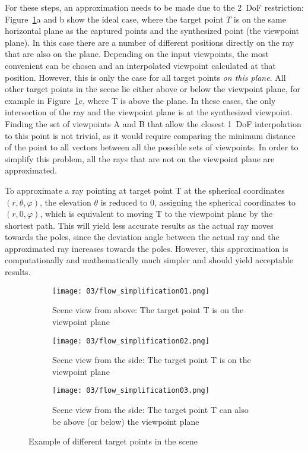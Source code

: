 For these steps, an approximation needs to be made due to the 2~DoF restriction: Figure~\ref{fig:flow_simplification-mot}a and b show the ideal case, where the target point $T$ is on the same horizontal plane as the captured points and the synthesized point (the viewpoint plane). In this case there are a number of different positions directly on the ray that are also on the plane. Depending on the input viewpoints, the most convenient can be chosen and an interpolated viewpoint calculated at that position. However, this is only the case for all target points \emph{on this plane}. All other target points in the scene lie either above or below the viewpoint plane, for example in Figure~\ref{fig:flow_simplification-mot}c, where T is above the plane. In these cases, the only intersection of the ray and the viewpoint plane is at the synthesized viewpoint. Finding the set of viewpoints A and B that allow the closest 1~DoF interpolation to this point is not trivial, as it would require comparing the minimum distance of the point to all vectors between all the possible sets of viewpoints. In order to simplify this problem, all the rays that are not on the viewpoint plane are approximated.

To approximate a ray pointing at target point T at the spherical coordinates $(r, \theta, \varphi)$, the elevation $\theta$ is reduced to 0, assigning the spherical coordinates to $(r, 0, \varphi)$, which is equivalent to moving T to the viewpoint plane by the shortest path. This will yield less accurate results as the actual ray moves towards the poles, since the deviation angle between the actual ray and the approximated ray increases towards the poles. However, this approximation is computationally and mathematically much simpler and should yield acceptable results.

\begin{figure}
\centering
    \hfill
    \begin{subfigure}[t]{0.3\textwidth}
            \centering
            \texttt{[image: 03/flow\_simplification01.png]}
            \caption{Scene view from above: The target point T is on the viewpoint plane}
    \end{subfigure}%
    \hfill
    \begin{subfigure}[t]{0.3\textwidth}
            \centering
            \texttt{[image: 03/flow\_simplification02.png]}
            \caption{Scene view from the side: The target point T is on the viewpoint plane}
    \end{subfigure}
    \hfill
    \begin{subfigure}[t]{0.3\textwidth}
            \centering
            \texttt{[image: 03/flow\_simplification03.png]}
            \caption{Scene view from the side: The target point T can also be above (or below) the viewpoint plane}
    \end{subfigure}%
    \hfill
    \hfill
  \caption{Example of different target points in the scene} \label{fig:flow_simplification-mot}
\end{figure}

